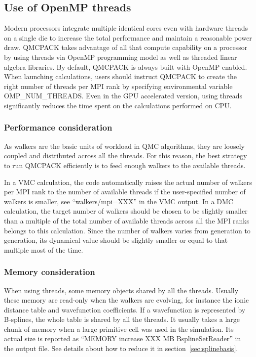 \subsection{Use of OpenMP threads}
\label{sec:openmprunning}
Modern processors integrate multiple identical cores even with hardware threads on a single die to increase the total performance and maintain a reasonable power draw. 
QMCPACK takes advantage of all that compute capability on a processor by using threads via OpenMP programming model as well as threaded linear algebra libraries. By default, QMCPACK is always built with OpenMP enabled. When launching calculations, users should instruct QMCPACK to create the right number of threads per MPI rank by specifying environmental variable OMP\_NUM\_THREADS. Even in the GPU accelerated version, using threads significantly reduces the time spent on the calculations performed on CPU.

\subsubsection{Performance consideration}
As walkers are the basic units of workload in QMC algorithms, they are loosely coupled and distributed across all the threads. For this reason, the best strategy to run QMCPACK efficiently is to feed enough walkers to the available threads.

In a VMC calculation, the code automatically raises the actual number of walkers per MPI rank to the number of available threads if the user-specified number of walkers is smaller, see ``walkers/mpi=XXX'' in the VMC output. 
In a DMC calculation, the target number of walkers should be chosen to be slightly smaller than a multiple of the total number of available threads across all the MPI ranks belongs to this calculation. Since the number of walkers varies from generation to generation, its dynamical value should be slightly smaller or equal to that multiple most of the time.

\subsubsection{Memory consideration}
When using threads, some memory objects shared by all the threads. Usually these memory are read-only when the walkers are evolving, for instance the ionic distance table and wavefunction coefficients.
If a wavefunction is represented by B-splines, the whole table is shared by all the threads. It usually takes a large chunk of memory when a large primitive cell was used in the simulation. Its actual size is reported as ``MEMORY increase XXX MB BsplineSetReader'' in the output file. 
See details about how to reduce it in section~\ref{sec:splinebasis}.


